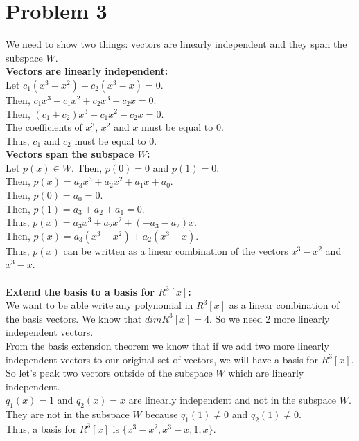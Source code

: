 \documentclass{article}
\begin{document}
\section*{Problem 3}
We need to show two things: vectors are linearly independent and they span the subspace \(W\). \\
\textbf{Vectors are linearly independent:} \\
Let \(c_1(x^3 - x^2) + c_2(x^3 - x) = 0\). \\
Then, \(c_1x^3 - c_1x^2 + c_2x^3 - c_2x = 0\). \\
Then, \((c_1 + c_2)x^3 - c_1x^2 - c_2x = 0\). \\
The coefficients of \(x^3\), \(x^2\) and \(x\) must be equal to 0. \\
Thus, \(c_1\) and \(c_2\) must be equal to 0. \\
\textbf{Vectors span the subspace \(W\):} \\
Let \(p(x) \in W\). Then, \(p(0) = 0\) and \(p(1) = 0\). \\
Then, \(p(x) = a_3x^3 + a_2x^2 + a_1x + a_0\). \\
Then, \(p(0) = a_0 = 0\). \\
Then, \(p(1) = a_3 + a_2 + a_1 = 0\). \\
Thus, \(p(x) = a_3x^3 + a_2x^2 + (-a_3 - a_2)x\). \\
Then, \(p(x) = a_3(x^3 - x^2) + a_2(x^3 - x)\). \\
Thus, \(p(x)\) can be written as a linear combination of the vectors \(x^3 - x^2\) and \(x^3 - x\). \\
\\
\textbf{Extend the basis to a basis for \(R^3[x]\):} \\
We want to be able write any polynomial in \(R^3[x]\) as a linear combination of the basis vectors. We know that \(dim R^3[x] = 4\). So we need 2 more linearly independent vectors. \\
From the basis extension theorem we know that if  we add two more linearly independent vectors to our original set of vectors, we will have a basis for \(R^3[x]\). \\
So let's peak two vectors outside of the subspace \(W\) which are linearly independent. \\
\(q_1(x) = 1\) and \(q_2(x) = x\) are linearly independent and not in the subspace \(W\). They are not in the subspace \(W\) because \(q_1(1) \neq 0\) and \(q_2(1) \neq 0\). \\
Thus, a basis for \(R^3[x]\) is \(\{x^3 - x^2, x^3 - x, 1, x\}\). \\
\end{document}
